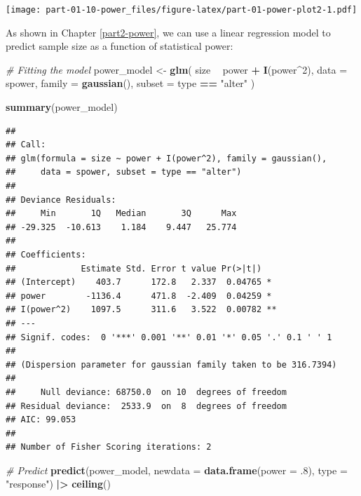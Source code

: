 \documentclass[]{book}
\newenvironment{Shaded}{\begin{snugshade}}{\end{snugshade}}
\newcommand{\CommentTok}[1]{\textcolor[rgb]{0.56,0.35,0.01}{\textit{#1}}}
\newcommand{\DataTypeTok}[1]{\textcolor[rgb]{0.13,0.29,0.53}{#1}}
\newcommand{\DecValTok}[1]{\textcolor[rgb]{0.00,0.00,0.81}{#1}}
\newcommand{\ErrorTok}[1]{\textcolor[rgb]{0.64,0.00,0.00}{\textbf{#1}}}
\newcommand{\FloatTok}[1]{\textcolor[rgb]{0.00,0.00,0.81}{#1}}
\newcommand{\KeywordTok}[1]{\textcolor[rgb]{0.13,0.29,0.53}{\textbf{#1}}}
\newcommand{\NormalTok}[1]{#1}
\newcommand{\OperatorTok}[1]{\textcolor[rgb]{0.81,0.36,0.00}{\textbf{#1}}}
\newcommand{\StringTok}[1]{\textcolor[rgb]{0.31,0.60,0.02}{#1}}
\begin{document}
\texttt{[image: part-01-10-power\_files/figure-latex/part-01-power-plot2-1.pdf]}

As shown in Chapter \ref{part2-power}, we can use a linear regression model to predict sample size as a function of statistical power:

\begin{Shaded}
\begin{Highlighting}[]
\CommentTok{# Fitting the model}
\NormalTok{power_model <-}\StringTok{ }\KeywordTok{glm}\NormalTok{(}
\NormalTok{  size }\OperatorTok{~}\StringTok{ }\NormalTok{power }\OperatorTok{+}\StringTok{ }\KeywordTok{I}\NormalTok{(power}\OperatorTok{^}\DecValTok{2}\NormalTok{),}
  \DataTypeTok{data =}\NormalTok{ spower, }\DataTypeTok{family =} \KeywordTok{gaussian}\NormalTok{(), }\DataTypeTok{subset =}\NormalTok{ type }\OperatorTok{==}\StringTok{ "alter"}
\NormalTok{)}

\KeywordTok{summary}\NormalTok{(power_model)}
\end{Highlighting}
\end{Shaded}

\begin{verbatim}
## 
## Call:
## glm(formula = size ~ power + I(power^2), family = gaussian(), 
##     data = spower, subset = type == "alter")
## 
## Deviance Residuals: 
##     Min       1Q   Median       3Q      Max  
## -29.325  -10.613    1.184    9.447   25.774  
## 
## Coefficients:
##             Estimate Std. Error t value Pr(>|t|)   
## (Intercept)    403.7      172.8   2.337  0.04765 * 
## power        -1136.4      471.8  -2.409  0.04259 * 
## I(power^2)    1097.5      311.6   3.522  0.00782 **
## ---
## Signif. codes:  0 '***' 0.001 '**' 0.01 '*' 0.05 '.' 0.1 ' ' 1
## 
## (Dispersion parameter for gaussian family taken to be 316.7394)
## 
##     Null deviance: 68750.0  on 10  degrees of freedom
## Residual deviance:  2533.9  on  8  degrees of freedom
## AIC: 99.053
## 
## Number of Fisher Scoring iterations: 2
\end{verbatim}

\begin{Shaded}
\begin{Highlighting}[]
\CommentTok{# Predict}
\KeywordTok{predict}\NormalTok{(power_model, }\DataTypeTok{newdata =} \KeywordTok{data.frame}\NormalTok{(}\DataTypeTok{power =} \FloatTok{.8}\NormalTok{), }\DataTypeTok{type =} \StringTok{"response"}\NormalTok{) }\OperatorTok{|}\ErrorTok{>}
\StringTok{  }\KeywordTok{ceiling}\NormalTok{()}
\end{Highlighting}
\end{Shaded}
\end{document}
